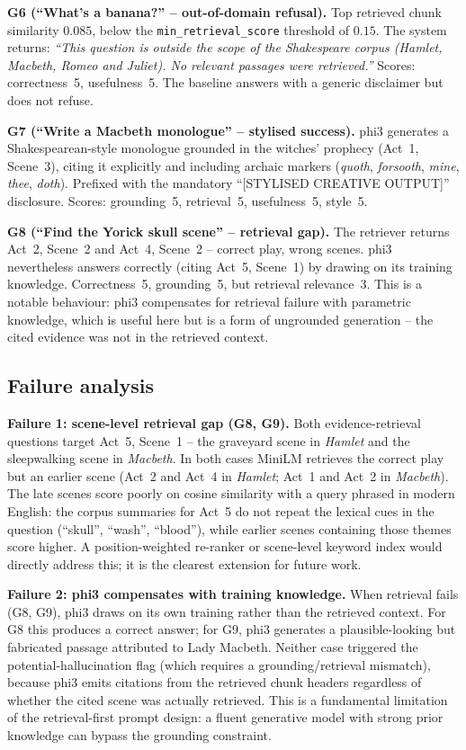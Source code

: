 \documentclass[10pt,conference]{IEEEtran}
\begin{document}
\textbf{G6 (``What's a banana?'' -- out-of-domain refusal).}
Top retrieved chunk similarity $0.085$, below the
\texttt{min\_retrieval\_score} threshold of $0.15$. The system
returns: \emph{``This question is outside the scope of the Shakespeare
corpus (Hamlet, Macbeth, Romeo and Juliet). No relevant passages were
retrieved.''} Scores: correctness~5, usefulness~5. The baseline
answers with a generic disclaimer but does not refuse.

\textbf{G7 (``Write a Macbeth monologue'' -- stylised success).}
phi3 generates a Shakespearean-style monologue grounded in the
witches' prophecy (Act~1, Scene~3), citing it explicitly and including
archaic markers (\emph{quoth}, \emph{forsooth}, \emph{mine},
\emph{thee}, \emph{doth}). Prefixed with the mandatory
``[STYLISED CREATIVE OUTPUT]'' disclosure. Scores: grounding~5,
retrieval~5, usefulness~5, style~5.

\textbf{G8 (``Find the Yorick skull scene'' -- retrieval gap).}
The retriever returns Act~2, Scene~2 and Act~4, Scene~2 -- correct
play, wrong scenes. phi3 nevertheless answers correctly (citing
Act~5, Scene~1) by drawing on its training knowledge. Correctness~5,
grounding~5, but retrieval relevance~3. This is a notable behaviour:
phi3 compensates for retrieval failure with parametric knowledge,
which is useful here but is a form of ungrounded generation -- the
cited evidence was not in the retrieved context.

\subsection{Failure analysis}
\label{sec:failure-analysis}

\textbf{Failure 1: scene-level retrieval gap (G8, G9).}
Both evidence-retrieval questions target Act~5, Scene~1 -- the
graveyard scene in \emph{Hamlet} and the sleepwalking scene in
\emph{Macbeth}. In both cases MiniLM retrieves the correct play but
an earlier scene (Act~2 and Act~4 in \emph{Hamlet}; Act~1 and Act~2
in \emph{Macbeth}). The late scenes score poorly on cosine similarity
with a query phrased in modern English: the corpus summaries for
Act~5 do not repeat the lexical cues in the question
(``skull'', ``wash'', ``blood''), while earlier scenes containing
those themes score higher. A position-weighted re-ranker or
scene-level keyword index would directly address this; it is the
clearest extension for future work.

\textbf{Failure 2: phi3 compensates with training knowledge.}
When retrieval fails (G8, G9), phi3 draws on its own training rather
than the retrieved context. For G8 this produces a correct answer;
for G9, phi3 generates a plausible-looking but fabricated passage
attributed to Lady Macbeth. Neither case triggered the
potential-hallucination flag (which requires a grounding/retrieval
mismatch), because phi3 emits citations from the retrieved chunk
headers regardless of whether the cited scene was actually retrieved.
This is a fundamental limitation of the retrieval-first prompt
design: a fluent generative model with strong prior knowledge can
bypass the grounding constraint.
\end{document}
